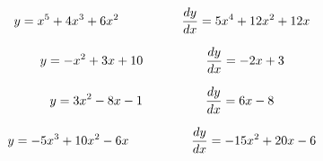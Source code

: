 \vskip 20pt

$$y = x^5 + 4x^3 + 6x^2 \hbox{\hskip 50pt} {dy \over dx} = 5x^4 + 12x^2 + 12x$$

\vskip 20pt

$$y = -x^2 + 3x + 10 \hbox{\hskip 50pt} {dy \over dx} = -2x + 3$$

\vskip 20pt

$$y = 3x^2 - 8x - 1 \hbox{\hskip 50pt} {dy \over dx} = 6x - 8$$

\vskip 20pt

$$y = -5x^3 + 10x^2 - 6x \hbox{\hskip 50pt} {dy \over dx} = -15x^2 + 20x - 6$$













